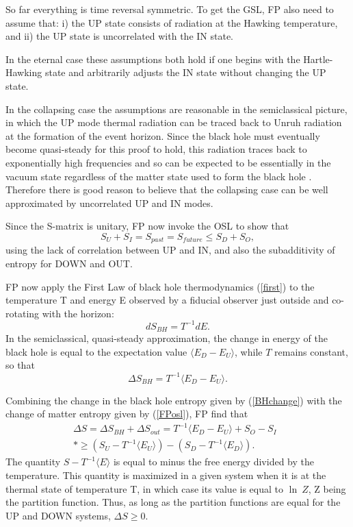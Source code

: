 \documentclass[12pt]{article}
\begin{document}
So far everything is time reversal symmetric.  To get the GSL, FP also need to assume that: i) the UP state consists of radiation at the Hawking temperature, and ii) the UP state is uncorrelated with the IN state.

In the eternal case these assumptions both hold if one begins with the Hartle-Hawking state and arbitrarily adjusts the IN state without changing the UP state.

In the collapsing case the assumptions are reasonable in the semiclassical picture, in which the UP mode thermal radiation can be traced back to Unruh radiation at the formation of the event horizon.  Since the black hole must eventually become quasi-steady for this proof to hold, this radiation traces back to exponentially high frequencies and so can be expected to be essentially in the vacuum state regardless of the matter state used to form the black hole \cite{FP93}.  Therefore there is good reason to believe that the collapsing case can be well approximated by uncorrelated UP and IN modes.

Since the S-matrix is unitary, FP now invoke the OSL to show that
\begin{equation}\label{FPosl}
S_{U} + S_{I} = S_{past} = S_{future} \le S_{D} + S_{O},
\end{equation}
using the lack of correlation between UP and IN, and also the subadditivity of entropy for DOWN and OUT.

FP now apply the First Law of black hole thermodynamics (\ref{first}) to the temperature T and energy E observed by a fiducial observer just outside and co-rotating with the horizon:
\begin{equation}
dS_{BH} = T^{-1}dE.
\end{equation}
In the semiclassical, quasi-steady approximation, the change in energy of the black hole is equal to the expectation value $\langle E_{D} - E_{U} \rangle$, while $T$ remains constant, so that
\begin{equation}\label{BHchange}
\Delta S_{BH} = T^{-1} \langle E_{D} - E_{U} \rangle.
\end{equation}

Combining the change in the black hole entropy given by (\ref{BHchange})
with the change of matter entropy given by (\ref{FPosl}), FP find that
\begin{eqnarray}
\Delta S = \Delta S_{BH} + \Delta S_{out} = T^{-1}\langle E_{D} - E_{U} \rangle + S_{O} - S_{I}
   \\*	
   \ge (S_{U} - T^{-1}\langle E_{U} \rangle) 
     - (S_{D} - T^{-1}\langle E_{D} \rangle).\phantom{MMM}
\end{eqnarray}
The quantity $S - T^{-1} \langle E \rangle $ is equal to minus the free energy divided by the temperature.  This quantity is maximized in a given system when it is at the thermal state of temperature T, in which case its value is equal to $\ln \: Z$, Z being the partition function.  Thus, as long as the partition functions are equal for the UP and DOWN systems, 
$\Delta S \ge 0$.
\end{document}
